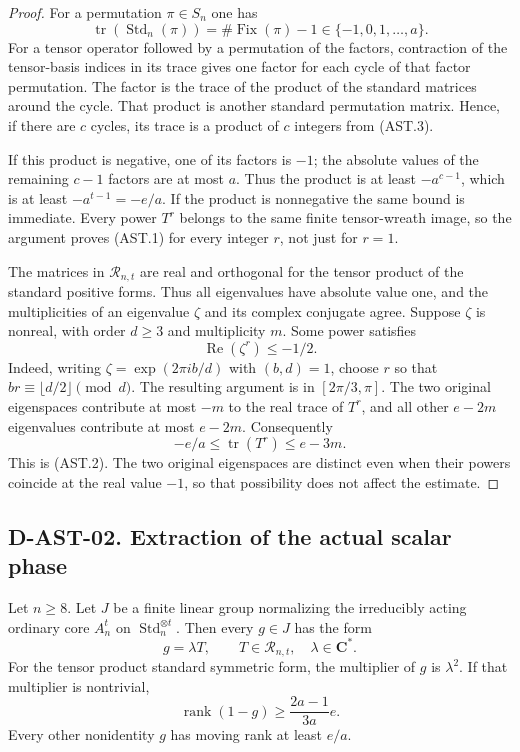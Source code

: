 \begin{proof}
For a permutation $\pi\in S_n$ one has
\[
          \operatorname{tr}(\operatorname{Std}_n(\pi))
                       =\#\operatorname{Fix}(\pi)-1
                       \in\{-1,0,1,\ldots,a\}.            \tag{AST.3}
\]
For a tensor operator followed by a permutation of the factors,
contraction of the tensor-basis indices in its trace gives one
factor for each cycle of that factor permutation.  The factor
is the trace of the product of the standard matrices around
the cycle.  That product is another standard permutation
matrix.  Hence, if there are $c$ cycles, its trace is a product
of $c$ integers from (AST.3).

If this product is negative, one of its factors is $-1$;
the absolute values of the remaining $c-1$ factors are at
most $a$.  Thus the product is at least $-a^{c-1}$, which
is at least $-a^{t-1}=-e/a$.  If the product is nonnegative
the same bound is immediate.  Every power $T^r$ belongs to
the same finite tensor-wreath image, so the argument proves
(AST.1) for every integer $r$, not just for $r=1$.

The matrices in $\mathcal R_{n,t}$ are real and orthogonal
for the tensor product of the standard positive forms.
Thus all eigenvalues have absolute value one, and the
multiplicities of an eigenvalue $\zeta$ and its complex
conjugate agree.  Suppose $\zeta$ is nonreal, with order
$d\ge3$ and multiplicity $m$.  Some power satisfies
\[
                         \operatorname{Re}(\zeta^r)\le-1/2.
\]
Indeed, writing $\zeta=\exp(2\pi i b/d)$ with $(b,d)=1$,
choose $r$ so that $br\equiv\lfloor d/2\rfloor\pmod d$.
The resulting argument is in $[2\pi/3,\pi]$.
The two original eigenspaces contribute at most $-m$ to
the real trace of $T^r$, and all other $e-2m$ eigenvalues
contribute at most $e-2m$.  Consequently
\[
                      -e/a\le\operatorname{tr}(T^r)
                                  \le e-3m.
\]
This is (AST.2).  The two original eigenspaces are distinct
even when their powers coincide at the real value $-1$, so
that possibility does not affect the estimate.
\end{proof}

\subsection*{D-AST-02. Extraction of the actual scalar phase}

\begin{lemma}
\label{D-AST-02}
Let $n\ge8$.  Let $J$ be a finite linear group normalizing
the irreducibly acting ordinary core $A_n^t$ on
$\operatorname{Std}_n^{\otimes t}$.  Then every $g\in J$
has the form
\[
                     g=\lambda T,\qquad
             T\in\mathcal R_{n,t},\quad \lambda\in\mathbf C^*.
                                                               \tag{AST.4}
\]
For the tensor product standard symmetric form, the multiplier
of $g$ is $\lambda^2$.  If that multiplier is nontrivial,
\[
                 \operatorname{rank}(1-g)
                         \ge\frac{2a-1}{3a}e.              \tag{AST.5}
\]
Every other nonidentity $g$ has moving rank at least $e/a$.
\end{lemma}

